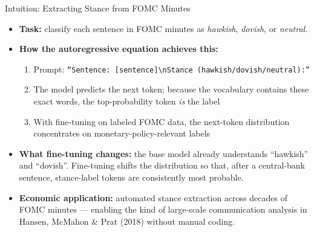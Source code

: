 \documentclass[10pt,english,aspectratio=169]{beamer}
\begin{document}
\begin{frame}{Intuition: Extracting Stance from FOMC Minutes}
\begin{itemize}
\item \textbf{Task:} classify each sentence in FOMC minutes as \emph{hawkish}, \emph{dovish}, or \emph{neutral}.

\medskip
\item \textbf{How the autoregressive equation achieves this:}
\begin{enumerate}
    \item Prompt: \texttt{``Sentence: [sentence]\textbackslash nStance (hawkish/dovish/neutral):''}
    \item The model predicts the next token; because the vocabulary contains these exact words, the top-probability token \emph{is} the label
    \item With fine-tuning on labeled FOMC data, the next-token distribution concentrates on monetary-policy-relevant labels
\end{enumerate}

\medskip
\item \textbf{What fine-tuning changes:} the base model already understands ``hawkish'' and ``dovish''. Fine-tuning shifts the distribution so that, after a central-bank sentence, stance-label tokens are consistently most probable.

\medskip
\item \textbf{Economic application:} automated stance extraction across decades of FOMC minutes --- enabling the kind of large-scale communication analysis in Hansen, McMahon \& Prat (2018) without manual coding.
\end{itemize}
\end{frame}
\end{document}
